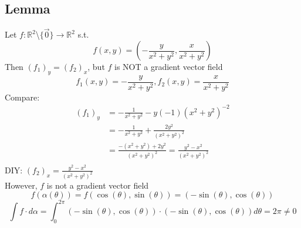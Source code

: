 \documentclass[12pt]{article}
\newcommand{\BR}{\mathbb R}
\begin{document}
\subsection*{Lemma}
  Let $f:\BR^2$\textbackslash$\{\vec{0}\}\rightarrow\BR^2$ s.t. \\
  \[ f(x,y)=(-\frac{y}{x^2+y^2},\frac{x}{x^2+y^2}) \]
  Then $(f_1)_y=(f_2)_x$, but $f$ is NOT a gradient vector field \\
  \[f_1(x,y)=-\frac{y}{x^2+y^2},f_2(x,y)=\frac{x}{x^2+y^2} \]
  Compare: \\
  \begin{align*}
    (f_1)_y & =-\frac{1}{x^2+y^2}-y(-1)(x^2+y^2)^{-2} \\
    & = -\frac{1}{x^2+y^2}+\frac{2y^2}{(x^2+y^2)^2} \\
    & = \frac{-(x^2+y^2)+2y^2}{(x^2+y^2)^2}=\frac{y^2-x^2}{(x^2+y^2)^2} \\
  \end{align*}
  DIY: $(f_2)_x=\frac{y^2-x^2}{(x^2+y^2)^2}$ \\
  However, $f$ is not a gradient vector field \\
  \[ f(\alpha(\theta))=f(\cos(\theta),\sin(\theta))=(-\sin(\theta),\cos(\theta)) \]
  \[ \int f\cdot d\alpha = \int_0^{2\pi}(-\sin(\theta),\cos(\theta))\cdot(-\sin(\theta),\cos(\theta))d\theta=2\pi\neq 0 \]
\end{document}
